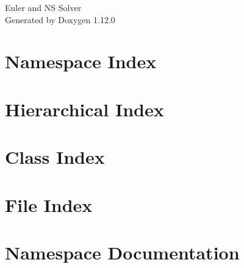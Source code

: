 \documentclass[twoside]{book}
\newcommand{\+}{\discretionary{\mbox{\scriptsize$\hookleftarrow$}}{}{}}
\newcommand{\clearemptydoublepage}{%
    \newpage{\pagestyle{empty}\cleardoublepage}%
  }
\begin{document}
  \raggedbottom
    \hypersetup{pageanchor=false,
                bookmarksnumbered=true,
                pdfencoding=unicode
               }
  \begin{titlepage}
  \vspace*{7cm}
  \begin{center}%
  {\Large Euler and NS Solver}\\
  \vspace*{1cm}
  {\large Generated by Doxygen 1.12.0}\\
  \end{center}
  \end{titlepage}
  \clearemptydoublepage
  \tableofcontents
  \clearemptydoublepage
  \hypersetup{pageanchor=true}
\chapter{Namespace Index}

\chapter{Hierarchical Index}

\chapter{Class Index}

\chapter{File Index}

\chapter{Namespace Documentation}


\end{document}
